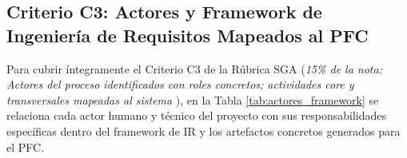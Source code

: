 
\subsection{Criterio C3: Actores y Framework de Ingeniería de Requisitos Mapeados al PFC}
Para cubrir íntegramente el Criterio C3 de la Rúbrica SGA (\textit{15\% de la nota: Actores del proceso identificados con roles concretos; actividades core y transversales mapeadas al sistema} \cite{ieee29148, pohl2025, ireb2023}), en la Tabla \ref{tab:actores_framework} se relaciona cada actor humano y técnico del proyecto con sus responsabilidades específicas dentro del framework de IR y los artefactos concretos generados para el PFC.

